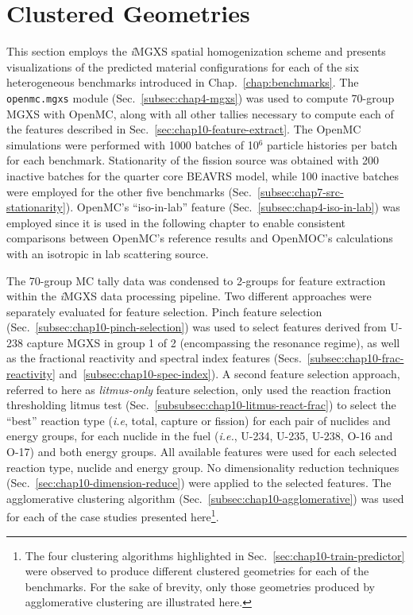 
\section{Clustered Geometries}
\label{sec:chap10-cluster-geometries}

This section employs the \textit{i}\ac{MGXS} spatial homogenization scheme and presents visualizations of the predicted material configurations for each of the six heterogeneous benchmarks introduced in Chap.~\ref{chap:benchmarks}. The \texttt{openmc.mgxs} module (Sec.~\ref{subsec:chap4-mgxs}) was used to compute 70-group \ac{MGXS} with OpenMC, along with all other tallies necessary to compute each of the features described in Sec.~\ref{sec:chap10-feature-extract}. The OpenMC simulations were performed with 1000 batches of 10$^{6}$ particle histories per batch for each benchmark. Stationarity of the fission source was obtained with 200 inactive batches for the quarter core \ac{BEAVRS} model, while 100 inactive batches were employed for the other five benchmarks (Sec.~\ref{subsec:chap7-src-stationarity}). OpenMC's ``iso-in-lab'' feature (Sec.~\ref{subsec:chap4-iso-in-lab}) was employed since it is used in the following chapter to enable consistent comparisons between OpenMC's reference results and OpenMOC's calculations with an isotropic in lab scattering source.

The 70-group \ac{MC} tally data was condensed to 2-groups for feature extraction within the \textit{i}\ac{MGXS} data processing pipeline. Two different approaches were separately evaluated for feature selection. Pinch feature selection (Sec.~\ref{subsec:chap10-pinch-selection}) was used to select features derived from U-238 capture \ac{MGXS} in group 1 of 2 (encompassing the resonance regime), as well as the fractional reactivity and spectral index features (Secs.~\ref{subsec:chap10-frac-reactivity} and~\ref{subsec:chap10-spec-index}). A second feature selection approach, referred to here as \textit{litmus-only} feature selection, only used the reaction fraction thresholding litmus test (Sec.~\ref{subsubsec:chap10-litmus-react-frac}) to select the ``best'' reaction type (\textit{i.e}, total, capture or fission) for each pair of nuclides and energy groups, for each nuclide in the fuel (\textit{i.e.}, U-234, U-235, U-238, O-16 and O-17) and both energy groups. All available features were used for each selected reaction type, nuclide and energy group. No dimensionality reduction techniques (Sec.~\ref{sec:chap10-dimension-reduce}) were applied to the selected features. The agglomerative clustering algorithm (Sec.~\ref{subsec:chap10-agglomerative}) was used for each of the case studies presented here\footnote{The four clustering algorithms highlighted in Sec.~\ref{sec:chap10-train-predictor} were observed to produce different clustered geometries for each of the benchmarks. For the sake of brevity, only those geometries produced by agglomerative clustering are illustrated here.}. 

